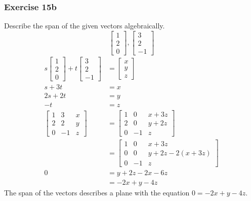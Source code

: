 \documentclass{math}
\begin{document}
\subsubsection*{Exercise 15b}
Describe the span of the given vectors algebraically.
\[ \begin{bmatrix}1 \\ 2 \\ 0\end{bmatrix},
  \begin{bmatrix}3 \\ 2 \\ -1\end{bmatrix} \]
\begin{align*}
  s\begin{bmatrix}1 \\ 2 \\ 0\end{bmatrix}+
    t\begin{bmatrix}3 \\ 2 \\ -1\end{bmatrix} &=
    \begin{bmatrix}x \\ y \\ z\end{bmatrix} \\
  s+3t &= x \\
  2s+2t &= y \\
  -t &= z \\
  \begin{bmatrix}
    1 & 3 & x \\
    2 & 2 & y \\
    0 & -1 & z
  \end{bmatrix} &= \begin{bmatrix}
    1 & 0 & x+3z \\
    2 & 0 & y+2z \\
    0 & -1 & z
  \end{bmatrix} \\
  &= \begin{bmatrix}
    1 & 0 & x+3z \\
    0 & 0 & y+2z-2(x+3z) \\
    0 & -1 & z
  \end{bmatrix} \\
  0 &= y+2z-2x-6z \\
  &= -2x+y-4z
\end{align*}
The span of the vectors describes a plane with the equation \( 0 = -2x+y-4z \).
\end{document}
